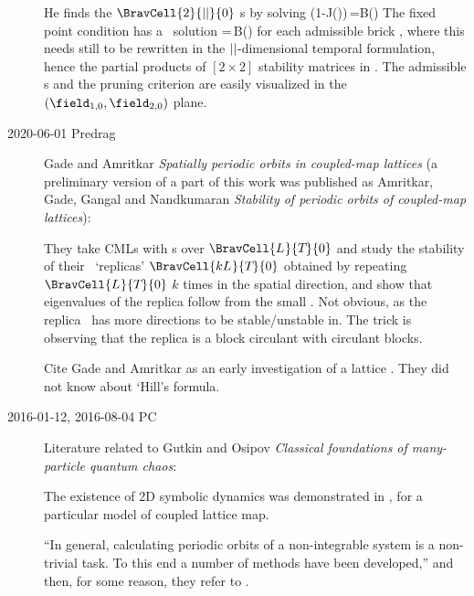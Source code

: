 \begin{description}
He finds the $\BravCell{2}{\cl{}}{0}$ \po s by solving
\beq
(1-J(\Mm))\,\Xx=B(\Mm)
The fixed
point condition  has a \po\ solution
\beq
\Xx=\,B(\Mm)
for each admissible brick \Mm, where this needs still to be rewritten in
the ${||}$-dimensional temporal {\lattstate} formulation, hence the
partial products of $[2\times2]$ stability matrices in
. The admissible {\lattstate}s and the
pruning criterion are easily visualized in the
$(\field_{1,0},\field_{2,0})$ plane.

\item[2020-06-01 Predrag]
Gade and Amritkar
{\em Spatially periodic orbits in coupled-map lattices}
(a preliminary version of a part of this work was published as
Amritkar, Gade, Gangal and Nandkumaran
{\em Stability of periodic orbits of coupled-map lattices}):

They take CMLs with \po s over $\BravCell{\speriod{}}{\period{}}{0}$ and
study the stability of their \po\ `replicas'
$\BravCell{k\speriod{}}{\period{}}{0}$ obtained by repeating
$\BravCell{\speriod{}}{\period{}}{0}$ $k$ times in the spatial direction,
and show that {\jacobianOrb} eigenvalues of the replica follow from the
small \po. Not obvious, as the replica \po\ has more directions to be
stable/unstable in. The trick is observing that the replica
{\jacobianOrb} is a block circulant with circulant blocks.

Cite Gade and Amritkar as an early investigation of a
lattice {\jacobianOrb}. They did not know about `Hill's formula.

\item[2016-01-12, 2016-08-04 PC] Literature
related to Gutkin and Osipov
{\em Classical foundations of many-particle quantum chaos}:

The  existence of 2D symbolic dynamics was demonstrated in
, for a particular model of coupled lattice map.

``In general, calculating periodic orbits of a  non-integrable  system  is
a  non-trivial  task.   To  this  end  a  number  of  methods have  been
developed,'' and then,  for some reason, they refer to .


\end{description}
